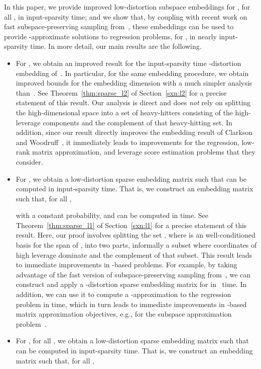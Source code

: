 \documentclass[11pt]{article}
\begin{document}
In this paper, we provide improved low-distortion subspace embeddings for
, for all , in input-sparsity time; and we show that, by
coupling with recent work on fast subspace-preserving sampling
from~\cite{CDMMMW13_SODA}, these embeddings can be used to provide
-approximate solutions to  regression problems, for
, in nearly input-sparsity time.
In more detail, our main results are the following.
\begin{itemize}
\item For , we obtain an improved result for the input-sparsity time
  -distortion embedding of~\cite{CW12sparse_TR}.
In particular, for the same embedding procedure, we obtain improved bounds 
  for the embedding dimension with a much simpler analysis 
  than~\cite{CW12sparse_TR}.
  See Theorem~\ref{thm:sparse_l2} of Section~\ref{sxn:l2} for a precise 
  statement of this result.
  Our analysis is direct and does \emph{not} rely on splitting the 
  high-dimensional space into a set of heavy-hitters consisting of the 
  high-leverage components and the complement of that heavy-hitting set.  
  In addition, since our result directly improves the  embedding 
  result of Clarkson and Woodruff~\cite{CW12sparse_TR}, it immediately leads 
  to improvements for the  regression, low-rank matrix approximation, 
  and  leverage score estimation problems that they consider.
\item For , we obtain a low-distortion sparse embedding matrix 
  such that  can be computed in input-sparsity time.
That is, we construct an embedding matrix  such that, for all ,
  
  with a constant probability, and  can be computed in 
  time.  
  See Theorem~\ref{thm:sparse_l1} of Section~\ref{sxn:l1} for a precise
  statement of this result.  
  Here, our proof involves splitting the set , where  is an  well-conditioned
  basis for the span of , into two parts, informally a subset where
  coordinates of high  leverage dominate  and the complement of
  that subset. 
  This  result leads to immediate improvements in -based
  problems.
  For example, by taking advantage of the fast version of subspace-preserving
  sampling from~\cite{CDMMMW13_SODA}, we can construct and apply a
  -distortion sparse embedding matrix for  in
  ~time. 
  In addition, we can use it to compute a -approximation to the
   regression problem in 
  time, which in turn leads to immediate improvements in -based matrix
  approximation objectives, e.g., for the  subspace approximation
  problem~\cite{bd09,SW11,CDMMMW13_SODA}.
\item For , for all , we obtain a low-distortion sparse
  embedding matrix  such that  can be computed in input-sparsity
  time.
  That is, we construct an embedding matrix 
  such that, for all ,
  

\end{itemize}
\end{document}
